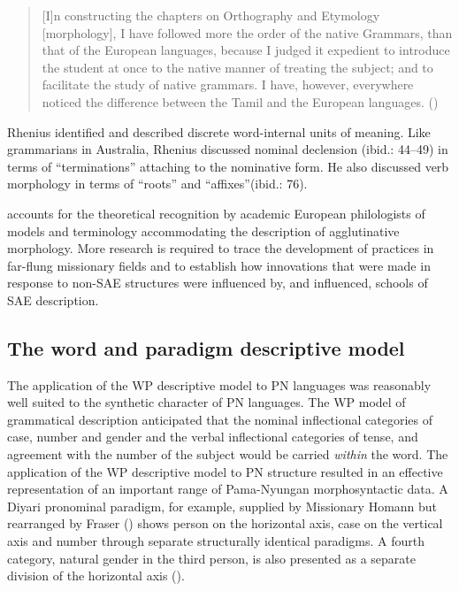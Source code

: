 \begin{quote}
    [I]n constructing the chapters on Orthography and Etymology [morphology], I have followed more the order of the native Grammars, than that of the European languages, because I judged it expedient to introduce the student at once to the native manner of treating the subject; and to facilitate the study of native grammars. I have, however, everywhere noticed the difference between the Tamil and the European languages. (\citealt[i]{rhenius_grammar_1836})
\end{quote}

Rhenius identified and described discrete word-internal units of meaning. Like grammarians in Australia, Rhenius discussed nominal declension (ibid.: 44--49) in terms of “terminations” attaching to the nominative form. He also discussed verb morphology in terms of “roots” and “affixes”(ibid.: 76). 

\citet{blevins_word-based_2013} accounts for the theoretical recognition by academic European philologists of models and terminology accommodating the description of agglutinative morphology. More research is required to trace the development of practices in far-flung missionary fields and to establish how innovations that were made in response to non-SAE structures were influenced by, and influenced, schools of SAE description.

\subsection{The word and paradigm descriptive model }
\label{sec:key:2.4.1}

The application of the WP descriptive model to PN languages was reasonably well suited to the synthetic character of PN languages. The WP model of grammatical description anticipated that the nominal inflectional categories of case, number and gender and the verbal inflectional categories of tense, and agreement with the number of the subject would be carried \textit{within} the word. The application of the WP descriptive model to PN structure resulted in an effective representation of an important range of Pama-Nyungan morphosyntactic data. A Diyari pronominal paradigm, for example, supplied by Missionary Homann but rearranged by Fraser () shows person on the horizontal axis, case on the vertical axis and number through separate structurally identical paradigms. A fourth category, natural gender in the third person, is also presented as a separate division of the horizontal axis (\citealt[43--44]{fraser_australian_1892}).

